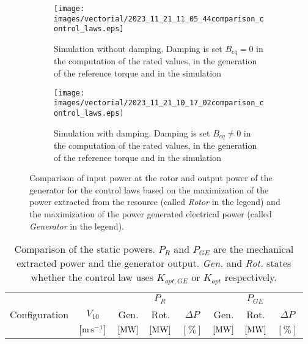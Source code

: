 \begin{figure}[!htbp]
  \centering
  \begin{subfigure}{\columnwidth}
    \texttt{[image: images/vectorial/2023\_11\_21\_11\_05\_44comparison\_control\_laws.eps]}
    \caption{Simulation without damping. Damping is set $B_{eq}=0$ in the computation of the rated values, in the generation of the reference torque and in the simulation}
    \label{fig:comparison_control_laws_no_B}
  \end{subfigure}
  \begin{subfigure}{\columnwidth}
    \texttt{[image: images/vectorial/2023\_11\_21\_10\_17\_02comparison\_control\_laws.eps]}
    \caption{Simulation with damping. Damping is set $B_{eq}\ne0$ in the computation of the rated values, in the generation of the reference torque and in the simulation}
    \label{fig:comparison_control_laws_B}
  \end{subfigure}
  \caption{Comparison of input power at the rotor and output power of the generator for the control laws based on the maximization of the power extracted from the resource (called \textit{Rotor} in the legend) and the maximization of the power generated electrical power (called \textit{Generator} in the legend).}
  \label{fig:comparison_control_laws}
\end{figure}

\begin{table}[!htbp]
  \centering
  \caption{Comparison of the static powers. $P_R$ and $P_{GE}$ are the mechanical extracted power and the generator output. \textit{Gen.} and \textit{Rot.} states whether the control law uses $K_{opt,GE}$ or $K_{opt}$ respectively.}
  \begin{tabular}{cc|ccc|ccc}
    \toprule
    & & \multicolumn{3}{c|}{$P_R$} & \multicolumn{3}{c}{$P_{GE}$} \\
    Configuration & $V_{10}$ & Gen.  & Rot.& $\Delta P$  & Gen.  & Rot.& $\Delta P$ \\ 
    & $\left[\si{\meter\per\second}\right]$ & $\left[\si{\mega\watt}\right]$ & $\left[\si{\mega\watt}\right]$ & $\left[\%\right]$ & $\left[\si{\mega\watt}\right]$ & $\left[\si{\mega\watt}\right]$ & $\left[\%\right]$ \\  \midrule
     
     
  \end{tabular}
  \label{tab:comp_powers}
\end{table}


